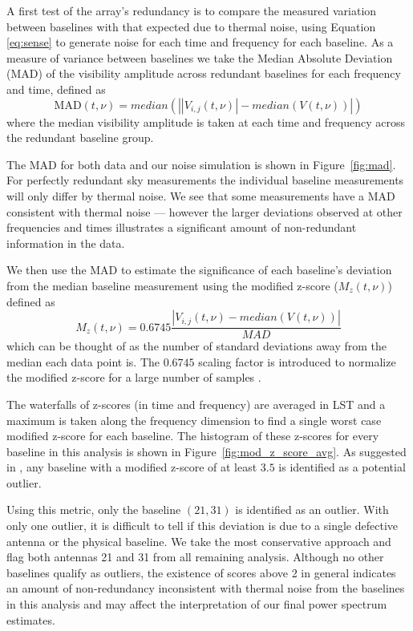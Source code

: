 A first test of the array's redundancy is to compare the measured variation between baselines
with that expected due to thermal noise, using Equation \eqref{eq:sense}
to generate noise for each time and frequency for each baseline.
As a measure of variance between baselines we take the Median Absolute Deviation
(MAD) of the visibility amplitude across redundant baselines
for each frequency and time, defined as
\begin{equation}
\text{MAD}(t,\nu) = median\left(\left| \left|V_{i,j}(t,\nu)\right|  - median \left(V(t,\nu)\right) \right|\right)\label{eqn:mad}
\end{equation}
where the median visibility amplitude is taken
at each time and frequency across the redundant baseline group.

The MAD for both data and our noise simulation is shown in  Figure~\ref{fig:mad}.
For perfectly redundant sky measurements the individual
baseline measurements will only differ by thermal noise.
We see that some measurements have a MAD consistent with thermal noise ---
however the larger deviations observed at other frequencies and times
illustrates a significant amount of non-redundant information in the data.

We then use the MAD to estimate the significance of each baseline's
deviation from the median baseline measurement using the modified z-score ($ M_{z}(t,\nu) $) defined as
\begin{equation}
M_{z}(t,\nu) = 0.6745\frac{\left|V_{i,j}(t,\nu) - median \left(V(t,\nu)
	\right)\right|}{MAD} \label{eqn:zscore}
\end{equation}
which can be thought of as the number of standard deviations
away from the median each data point is.
The $ 0.6745 $ scaling factor is introduced to normalize the
modified z-score for a large number of samples \citep{Iglewicz_and_hoaglin}.

The waterfalls of z-scores (in time and frequency) are averaged in LST
and a maximum is taken along the frequency dimension to find a single
worst case modified z-score for each baseline.
The histogram of these z-scores for every baseline in this analysis is shown in Figure~\ref{fig:mod_z_score_avg}.
As suggested in \citet{Iglewicz_and_hoaglin},
any baseline with a modified z-score of at least $ 3.5 $ is identified as a potential outlier.

Using this metric, only the baseline $ (21,31)  $
is identified as an outlier. With only one outlier, it is difficult
to tell if this deviation is due
to a single defective antenna or the physical baseline.
We take the most conservative approach and flag
both antennas 21 and 31 from all remaining analysis.
Although no other baselines qualify as outliers,
the existence of scores above 2 in general
indicates an amount of non-redundancy
inconsistent with thermal noise from the baselines in this analysis and may affect
the interpretation of our final
power spectrum estimates.

